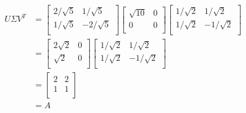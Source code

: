 \documentclass[11pt]{article}
\begin{document}
$$\begin{aligned}
U \Sigma V^T &=\begin{bmatrix}
2 / \sqrt5 & 1 / \sqrt5 \\
1 / \sqrt5 & -2 / \sqrt5 \\
\end{bmatrix} \begin{bmatrix}
\sqrt{10} & 0 \\
0 & 0 \\
\end{bmatrix} \begin{bmatrix}
1 / \sqrt2 & 1 / \sqrt2 \\
1 / \sqrt2 & -1 / \sqrt2 \\
\end{bmatrix} \\
&= \begin{bmatrix}
2 \sqrt2 & 0\\
\sqrt2 & 0 \\
\end{bmatrix} \begin{bmatrix}
1 / \sqrt2 & 1 / \sqrt2 \\
1 / \sqrt2 & -1 / \sqrt2 \\
\end{bmatrix} \\
&= \begin{bmatrix}
2 & 2 \\
1 & 1 \\
\end{bmatrix} \\
&= \boxed{A}
\end{aligned} $$
\end{document}
